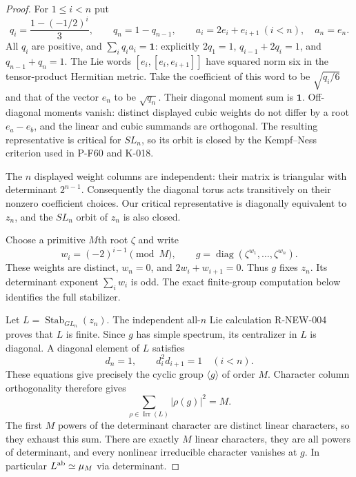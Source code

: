 \begin{proof}
For $1\le i<n$ put
\[
             q_i=\frac{1-(-1/2)^i}{3},\qquad
             q_n=1-q_{n-1},\qquad
 a_i=2e_i+e_{i+1}\ (i<n),\quad a_n=e_n.
\]
All $q_i$ are positive, and
$\sum_i q_i a_i=\mathbf1$: explicitly $2q_1=1$,
$q_{i-1}+2q_i=1$, and $q_{n-1}+q_n=1$.
The Lie words $[e_i,[e_i,e_{i+1}]]$ have squared norm six in
the tensor-product Hermitian metric.  Take the coefficient of
this word to be $\sqrt{q_i/6}$ and that of the vector $e_n$ to
be $\sqrt{q_n}$.  Their diagonal moment sum is $\mathbf1$.
Off-diagonal moments vanish: distinct displayed cubic weights
do not differ by a root $e_a-e_b$, and the linear and cubic
summands are orthogonal.  The resulting representative is
critical for $SL_n$, so its orbit is closed by the Kempf--Ness
criterion used in P-F60 and K-018.

The $n$ displayed weight columns are independent: their matrix
is triangular with determinant $2^{n-1}$.  Consequently the
diagonal torus acts transitively on their nonzero coefficient
choices.  Our critical representative is diagonally equivalent
to $z_n$, and the $SL_n$ orbit of $z_n$ is also closed.

Choose a primitive $M$th root $\zeta$ and write
\[
 w_i=(-2)^{i-1}\pmod M,\qquad
       g=\operatorname{diag}(\zeta^{w_1},\ldots,\zeta^{w_n}).
                                                               \tag{K-024b}
\]
These weights are distinct, $w_n=0$, and
$2w_i+w_{i+1}=0$.  Thus $g$ fixes $z_n$.
Its determinant exponent $\sum_iw_i$ is odd.  The exact
finite-group computation below identifies the full stabilizer.

Let $L=\operatorname{Stab}_{GL_n}(z_n)$.  The independent all-$n$
Lie calculation R-NEW-004 proves that $L$ is finite.  Since $g$
has simple spectrum, its centralizer in $L$ is diagonal.
A diagonal element of $L$ satisfies
\[
                     d_n=1,\qquad d_i^2d_{i+1}=1\quad(i<n).
\]
These equations give precisely the cyclic group $\langle g\rangle$
of order $M$.  Character column orthogonality therefore gives
\[
                  \sum_{\rho\in\operatorname{Irr}(L)}
                              |\rho(g)|^2=M.
\]
The first $M$ powers of the determinant character are distinct
linear characters, so they exhaust this sum.  There are exactly
$M$ linear characters, they are all powers of determinant,
and every nonlinear irreducible character vanishes at $g$.
In particular $L^{\rm ab}\simeq\mu_M$ via determinant.


\end{proof}
